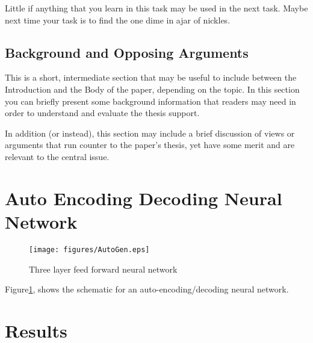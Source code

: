\documentclass{article}
\begin{document}
Little if anything that you learn in this task may be used in the next task. Maybe next time
your task is to find the one dime in ajar of nickles.


\subsection{Background and Opposing Arguments\label{sec:back}}

This is a short, intermediate section that may be useful to include
between the Introduction and the Body of the paper, depending on the
topic. In this section you can briefly present some background
information that readers may need in order to understand and evaluate
the thesis support. 

In addition (or instead), this section may include a brief discussion of views or arguments 
that run counter to the paper’s thesis, yet have some merit and are relevant to the central issue.

\newpage

\section{Auto Encoding Decoding Neural Network\label{sec:autoencoder}}

\begin{figure}
  \begin{center}
    \texttt{[image: figures/AutoGen.eps]}
    \caption{Three layer feed forward neural network}
    \label{fig:threelayer}
  \end{center}
\end{figure}

Figure\ref{fig:threelayer}, shows the schematic for an auto-encoding/decoding neural network.


\newpage

\section{Results\label{sec:results}}
\end{document}
